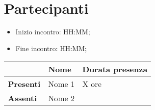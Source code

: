 \section{Partecipanti}

\begin{itemize}
    \item Inizio incontro: HH:MM;
    \item Fine incontro: HH:MM;
\end{itemize}


\begin{center}
{\renewcommand{\arraystretch}{1.5}
\begin{tabular}{l|ll}
	                    & \textbf{Nome}  & \textbf{Durata presenza} \\
	\hline
	\textbf{Presenti}   & Nome 1            & X ore     \\
	\textbf{Assenti}	& Nome 2            &      		\\
\end{tabular}	
}
\end{center}